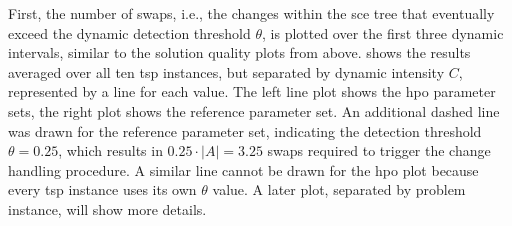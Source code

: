 First, the number of swaps, i.e., the changes within the \gls{sce} tree that eventually exceed the dynamic detection threshold $\theta$, is plotted over the first three dynamic intervals, similar to the solution quality plots from above.  shows the results averaged over all ten \gls{tsp} instances, but separated by dynamic intensity $C$, represented by a line for each value. The left line plot shows the \gls{hpo} parameter sets, the right plot shows the reference parameter set. An additional dashed line was drawn for the reference parameter set, indicating the detection threshold $\theta = 0.25$, which results in $0.25 \cdot |A| = 3.25$ swaps required to trigger the change handling procedure. A similar line cannot be drawn for the \gls{hpo} plot because every \gls{tsp} instance uses its own $\theta$ value. A later plot, separated by problem instance, will show more details.

